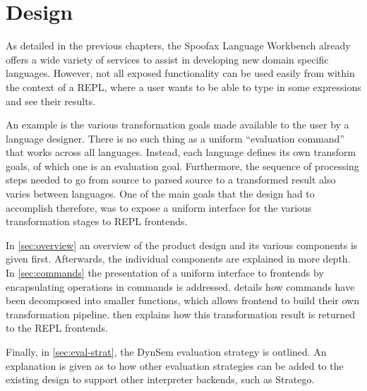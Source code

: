\chapter{Design}
\label{cha:design}

As detailed in the previous chapters, the Spoofax Language Workbench already
offers a wide variety of services to assist in developing new domain specific
languages. However, not all exposed functionality can be used easily from within
the context of a REPL, where a user wants to be able to type in some expressions
and see their results.

An example is the various transformation goals made available to the user by a
language designer. There is no such thing as a uniform ``evaluation command''
that works across all languages. Instead, each language defines its own
transform goals, of which one is an evaluation goal.  Furthermore, the sequence
of processing steps needed to go from source to parsed source to a transformed
result also varies between languages. One of the main goals that the design had to
accomplish therefore, was to expose a uniform interface for the various
transformation stages to REPL frontends.

In \cref{sec:overview} an overview of the product design and its various
components is given first. Afterwards, the individual components are
explained in more depth. In \cref{sec:commands} the presentation of a uniform
interface to frontends by encapsulating operations in commands is addressed.
 details how commands have been
decomposed into smaller functions, which allows frontend to build their own
transformation pipeline.  then explains how this
transformation result is returned to the REPL frontends.

Finally, in \cref{sec:eval-strat}, the DynSem evaluation strategy is outlined. 
An explanation is given as to how other evaluation strategies
can be added to the existing design to support other interpreter backends,
such as Stratego.







\section{}
\label{sec:visitor}



